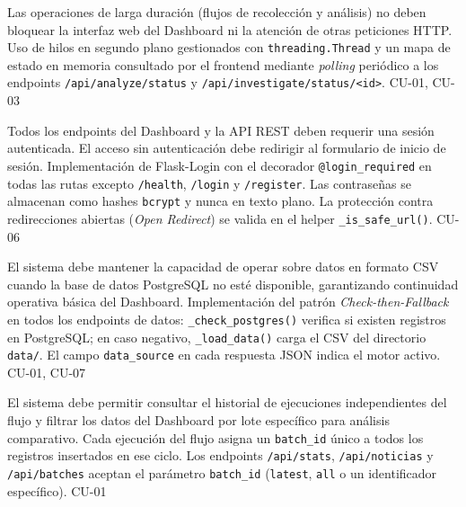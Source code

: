 \begin{NFRequerimientos}
            {Las operaciones de larga duración (flujos de recolección y análisis)
            no deben bloquear la interfaz web del Dashboard ni la atención de otras
            peticiones HTTP.}
            {Uso de hilos en segundo plano gestionados con \texttt{threading.Thread}
            y un mapa de estado en memoria consultado por el frontend mediante
            \textit{polling} periódico a los endpoints \texttt{/api/analyze/status}
            y \texttt{/api/investigate/status/<id>}.}
            {CU-01, CU-03}

            {Todos los endpoints del Dashboard y la API REST deben requerir una sesión
            autenticada. El acceso sin autenticación debe redirigir al formulario de
            inicio de sesión.}
            {Implementación de Flask-Login con el decorador \texttt{@login\_required}
            en todas las rutas excepto \texttt{/health}, \texttt{/login} y
            \texttt{/register}. Las contraseñas se almacenan como hashes \texttt{bcrypt}
            y nunca en texto plano. La protección contra redirecciones abiertas
            (\textit{Open Redirect}) se valida en el helper
            \texttt{\_is\_safe\_url()}.}
            {CU-06}

            {El sistema debe mantener la capacidad de operar sobre datos en formato
            CSV cuando la base de datos PostgreSQL no esté disponible, garantizando
            continuidad operativa básica del Dashboard.}
            {Implementación del patrón \textit{Check-then-Fallback} en todos los
            endpoints de datos: \texttt{\_check\_postgres()} verifica si existen
            registros en PostgreSQL; en caso negativo, \texttt{\_load\_data()}
            carga el CSV del directorio \texttt{data/}. El campo
            \texttt{data\_source} en cada respuesta JSON indica el motor activo.}
            {CU-01, CU-07}

            {El sistema debe permitir consultar el historial de ejecuciones
            independientes del flujo y filtrar los datos del Dashboard por
            lote específico para análisis comparativo.}
            {Cada ejecución del flujo asigna un \texttt{batch\_id} único a
            todos los registros insertados en ese ciclo. Los endpoints
            \texttt{/api/stats}, \texttt{/api/noticias} y \texttt{/api/batches}
            aceptan el parámetro \texttt{batch\_id} (\texttt{latest},
            \texttt{all} o un identificador específico).}
            {CU-01}

\end{NFRequerimientos}
